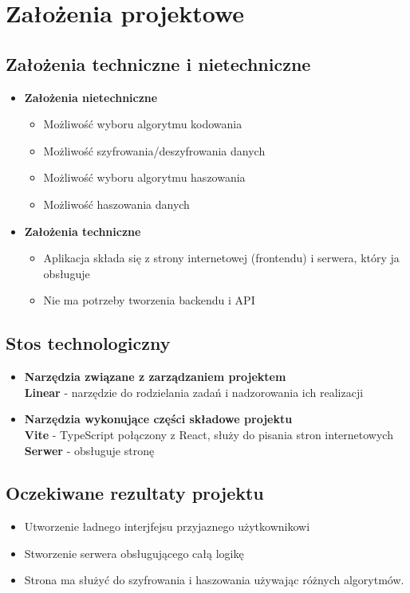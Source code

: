 \documentclass[12pt,a4paper]{article}
\begin{document}
\newpage
\section{Założenia projektowe}
\subsection{Założenia techniczne i nietechniczne}
	\begin{itemize}
	    \item \textbf{Założenia nietechniczne}
            \begin{itemize}
                \item Możliwość wyboru algorytmu kodowania
                \item Możliwość szyfrowania/deszyfrowania danych
                \item Możliwość wyboru algorytmu haszowania
                \item Możliwość haszowania danych
            \end{itemize}
        \item \textbf{Założenia techniczne}
            \begin{itemize}
                \item Aplikacja składa się z strony internetowej (frontendu) i serwera, który ja obsługuje
                \item Nie ma potrzeby tworzenia backendu i API
            \end{itemize}
	\end{itemize}

\subsection{Stos technologiczny}
	\begin{itemize}
	    \item \textbf{Narzędzia związane z zarządzaniem projektem}\\
            \textbf{Linear} - narzędzie do rodzielania zadań i nadzorowania ich realizacji
        \item \textbf{Narzędzia wykonujące części składowe projektu}\\
            \textbf{Vite} - TypeScript połączony z React, służy do pisania stron internetowych\\
            \textbf{Serwer} - obsługuje stronę
	\end{itemize}

\subsection{Oczekiwane rezultaty projektu}
    \begin{itemize}
        \item Utworzenie ładnego interjfejsu przyjaznego użytkownikowi
        \item Stworzenie serwera obsługującego całą logikę
        \item Strona ma służyć do szyfrowania i haszowania używając różnych algorytmów.
    \end{itemize}
	
\end{document}
